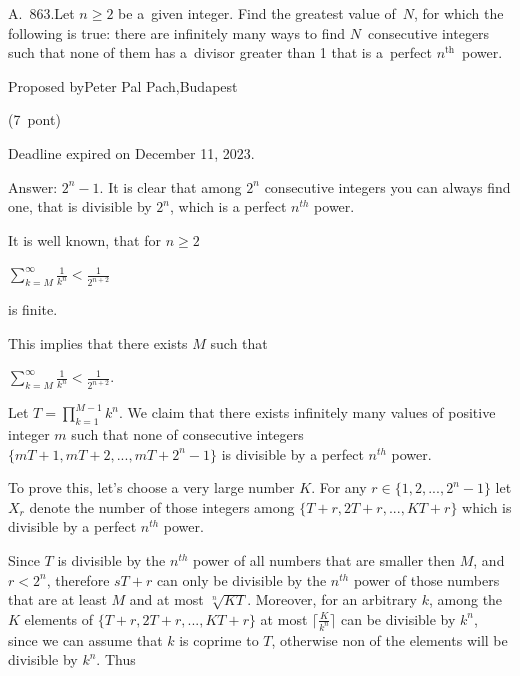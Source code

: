 \documentclass{article}
\begin{document}
A. 863.Let \(\displaystyle n\ge 2\) be a given integer. Find the greatest value of \(\displaystyle N\), for which the following is true: there are infinitely many ways to find \(\displaystyle N\) consecutive integers such that none of them has a divisor greater than 1 that is a perfect \(\displaystyle n^{\mathrm{th}}\) power.

Proposed byPeter Pal Pach,Budapest

(7 pont)

Deadline expired on December 11, 2023.

Answer: \(\displaystyle 2^n-1\). It is clear that among \(\displaystyle 2^n\) consecutive integers you can always find one, that is divisible by \(\displaystyle 2^n\), which is a perfect \(\displaystyle n^{th}\) power.

It is well known, that for \(\displaystyle n\ge 2\)

\(\displaystyle \sum_{k=M}^{\infty} \frac{1}{k^n}<\frac{1}{2^{n+2}}\)

is finite.

This implies that there exists \(\displaystyle M\) such that

\(\displaystyle \sum_{k=M}^{\infty} \frac{1}{k^n}<\frac{1}{2^{n+2}}.\)

Let \(\displaystyle T=\prod_{k=1}^{M-1} k^n\). We claim that there exists infinitely many values of positive integer \(\displaystyle m\) such that none of consecutive integers \(\displaystyle \{mT+1,mT+2,...,mT+2^n-1\}\) is divisible by a perfect \(\displaystyle n^{th}\) power.

To prove this, let's choose a very large number \(\displaystyle K\). For any \(\displaystyle r\in \{1,2,...,2^n-1\}\) let \(\displaystyle X_r\) denote the number of those integers among \(\displaystyle \{T+r,2T+r,...,KT+r\}\) which is divisible by a perfect \(\displaystyle n^{th}\) power.

Since \(\displaystyle T\) is divisible by the \(\displaystyle n^{th}\) power of all numbers that are smaller then \(\displaystyle M\), and \(\displaystyle r<2^n\), therefore \(\displaystyle sT+r\) can only be divisible by the \(\displaystyle n^{th}\) power of those numbers that are at least \(\displaystyle M\) and at most \(\displaystyle \sqrt[n]{KT}\). Moreover, for an arbitrary \(\displaystyle k\), among the \(\displaystyle K\) elements of \(\displaystyle \{T+r,2T+r,...,KT+r\}\) at most \(\displaystyle \lceil \frac{K}{k^n} \rceil\) can be divisible by \(\displaystyle k^n\), since we can assume that \(\displaystyle k\) is coprime to \(\displaystyle T\), otherwise non of the elements will be divisible by \(\displaystyle k^n\). Thus
\end{document}

